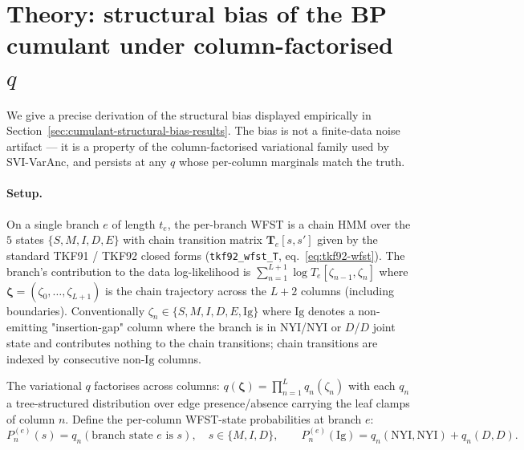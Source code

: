 
\section{Theory: structural bias of the BP cumulant under
column-factorised \texorpdfstring{$q$}{q}}
\label{app:cumulant-structural-bias}

We give a precise derivation of the structural bias displayed
empirically in
Section~\ref{sec:cumulant-structural-bias-results}.  The bias is
not a finite-data noise artifact — it is a property of the
column-factorised variational family used by SVI-VarAnc, and
persists at any $q$ whose per-column marginals match the truth.

\paragraph{Setup.}
On a single branch $e$ of length $t_e$, the per-branch WFST is a
chain HMM over the $5$ states $\{S, M, I, D, E\}$ with chain
transition matrix $\mathbf{T}_e[s, s']$ given by the standard
TKF91 / TKF92 closed forms (\texttt{tkf92\_wfst\_T}, eq.\
\ref{eq:tkf92-wfst}).  The branch's contribution to the data
log-likelihood is $\sum_{n=1}^{L+1} \log T_e[\zeta_{n-1}, \zeta_n]$
where $\boldsymbol{\zeta} = (\zeta_0, \dots, \zeta_{L+1})$ is the chain
trajectory across the $L+2$ columns (including boundaries).
Conventionally $\zeta_n \in \{S, M, I, D, E, \mathrm{Ig}\}$ where $\mathrm{Ig}$
denotes a non-emitting "insertion-gap" column where the branch is
in NYI/NYI or $D$/$D$ joint state and contributes nothing to the
chain transitions; chain transitions are indexed by consecutive
non-$\mathrm{Ig}$ columns.

The variational $q$ factorises across columns: $q(\boldsymbol{\zeta}) =
\prod_{n=1}^L q_n(\zeta_n)$ with each $q_n$ a tree-structured
distribution over edge presence/absence carrying the leaf clamps
of column $n$.  Define the per-column WFST-state probabilities at
branch $e$:
\begin{equation}
P_n^{(e)}(s) = q_n(\text{branch state } e \text{ is } s),
\quad s \in \{M, I, D\},
\qquad
P_n^{(e)}(\mathrm{Ig}) = q_n(\text{NYI},\text{NYI}) + q_n(D, D).
\end{equation}

